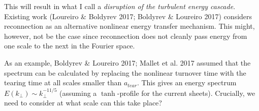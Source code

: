 \documentclass[usenatbib,twocolumn, twocolappendix]{aastex63}
\begin{document}
This will result in what I call a \textit{disruption of the turbulent energy cascade}.
Existing work (Loureiro \& Boldyrev 2017; Boldyrev \& Loureiro 2017) considers reconnection as an alternative nonlinear energy transfer mechanism. 
This might, however, not be the case since reconnection does not cleanly pass energy from one scale to the next in the Fourier space.

As an example, Boldyrev \& Loureiro 2017; Mallet et al. 2017 assumed that the spectrum can be calculated by replacing the nonlinear turnover time with the tearing time at all scales smaller than $a_{tear}$.
This gives an energy spectrum $E(k_\perp) \sim k_\perp^{-11/5}$ (assuming a $\tanh$-profile for the current sheets).
Crucially, we need to consider at what scale can this take place?








\end{document}
